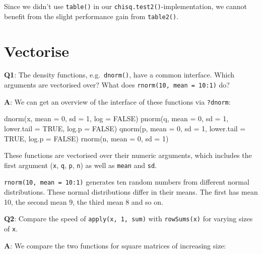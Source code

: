 \documentclass[
]{krantz}
\makeatletter
\newenvironment{Shaded}{\begin{snugshade}}{\end{snugshade}}
\newcommand{\DataTypeTok}[1]{\textcolor[rgb]{0.13,0.29,0.53}{#1}}
\newcommand{\DecValTok}[1]{\textcolor[rgb]{0.00,0.00,0.81}{#1}}
\newcommand{\KeywordTok}[1]{\textcolor[rgb]{0.13,0.29,0.53}{\textbf{#1}}}
\newcommand{\NormalTok}[1]{#1}
\newcommand{\OtherTok}[1]{\textcolor[rgb]{0.56,0.35,0.01}{#1}}
\newenvironment{kframe}{%
\medskip{}
\setlength{\fboxsep}{.8em}
 \def\at@end@of@kframe{}%
 \ifinner\ifhmode%
  \def\at@end@of@kframe{\end{minipage}}%
  \begin{minipage}{\columnwidth}%
 \fi\fi%
 \def\FrameCommand##1{\hskip\@totalleftmargin \hskip-\fboxsep
 \colorbox{shadecolor}{##1}\hskip-\fboxsep
     \hskip-\linewidth \hskip-\@totalleftmargin \hskip\columnwidth}%
 \MakeFramed {\advance\hsize-\width
   \@totalleftmargin\z@ \linewidth\hsize
   \@setminipage}}%
 {\par\unskip\endMakeFramed%
 \at@end@of@kframe}
\renewenvironment{Shaded}{\begin{kframe}}{\end{kframe}}
\renewcommand{\KeywordTok} [1]{\textcolor[rgb]{0.00,0.44,0.13}{{#1}}}
\renewcommand{\DataTypeTok}[1]{\textcolor[rgb]{0.56,0.13,0.00}{{#1}}}
\renewcommand{\DecValTok}  [1]{\textcolor[rgb]{0.25,0.63,0.44}{{#1}}}
\renewcommand{\OtherTok}   [1]{\textcolor[rgb]{0.00,0.44,0.13}{{#1}}}
\renewcommand{\NormalTok}  [1]{{#1}}
\makeatother
\begin{document}
Since we didn't use \texttt{table()} in our \texttt{chisq.test2()}-implementation, we cannot benefit from the slight performance gain from \texttt{table2()}.

\hypertarget{vectorise}{%
\section{Vectorise}\label{vectorise}}

\textbf{{Q1}}: The density functions, e.g.~\texttt{dnorm()}, have a common interface. Which arguments are vectorised over? What does \texttt{rnorm(10,\ mean\ =\ 10:1)} do?

\textbf{{A}}: We can get an overview of the interface of these functions via \texttt{?dnorm}:

\begin{Shaded}
\begin{Highlighting}[]
\KeywordTok{dnorm}\NormalTok{(x, }\DataTypeTok{mean =} \DecValTok{0}\NormalTok{, }\DataTypeTok{sd =} \DecValTok{1}\NormalTok{, }\DataTypeTok{log =} \OtherTok{FALSE}\NormalTok{)}
\KeywordTok{pnorm}\NormalTok{(q, }\DataTypeTok{mean =} \DecValTok{0}\NormalTok{, }\DataTypeTok{sd =} \DecValTok{1}\NormalTok{, }\DataTypeTok{lower.tail =} \OtherTok{TRUE}\NormalTok{, }\DataTypeTok{log.p =} \OtherTok{FALSE}\NormalTok{)}
\KeywordTok{qnorm}\NormalTok{(p, }\DataTypeTok{mean =} \DecValTok{0}\NormalTok{, }\DataTypeTok{sd =} \DecValTok{1}\NormalTok{, }\DataTypeTok{lower.tail =} \OtherTok{TRUE}\NormalTok{, }\DataTypeTok{log.p =} \OtherTok{FALSE}\NormalTok{)}
\KeywordTok{rnorm}\NormalTok{(n, }\DataTypeTok{mean =} \DecValTok{0}\NormalTok{, }\DataTypeTok{sd =} \DecValTok{1}\NormalTok{)}
\end{Highlighting}
\end{Shaded}

These functions are vectorised over their numeric arguments, which includes the first argument (\texttt{x}, \texttt{q}, \texttt{p}, \texttt{n}) as well as \texttt{mean} and \texttt{sd}.

\texttt{rnorm(10,\ mean\ =\ 10:1)} generates ten random numbers from different normal distributions. These normal distributions differ in their means. The first has mean 10, the second mean 9, the third mean 8 and so on.

\textbf{{Q2}}: Compare the speed of \texttt{apply(x,\ 1,\ sum)} with \texttt{rowSums(x)} for varying sizes of \texttt{x}.

\textbf{{A}}: We compare the two functions for square matrices of increasing size:
\end{document}
